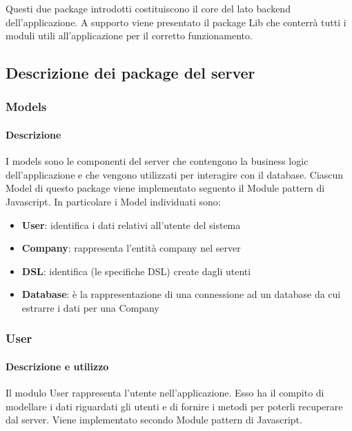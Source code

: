 Questi due package introdotti costituiscono il core del lato backend dell'applicazione. A supporto viene presentato il package Lib che conterrà tutti i moduli utili all'applicazione per il corretto funzionamento.





\subsection{Descrizione dei package del server} %
\subsubsection{Models}
\paragraph*{Descrizione} 
I models sono le componenti del server che contengono la business logic dell'applicazione e che vengono utilizzati per interagire con il database.
Ciascun Model di questo package viene implementato seguento il Module pattern di Javascript. %
In particolare i Model individuati sono:
\begin{itemize}
\item \textbf{User}: identifica i dati relativi all'utente del sistema
\item \textbf{Company}: rappresenta l'entità company nel server
\item \textbf{DSL}: identifica (le specifiche DSL) create dagli utenti
\item \textbf{Database}: è la rappresentazione di una connessione ad un database da cui estrarre i dati per una Company
\end{itemize}

\subsubsection{User}
\paragraph*{Descrizione e utilizzo}
Il modulo User rappresenta l'utente nell'applicazione. Esso ha il compito di modellare i dati riguardati gli utenti e di fornire i metodi per poterli recuperare dal server. Viene implementato secondo Module pattern di Javascript.

